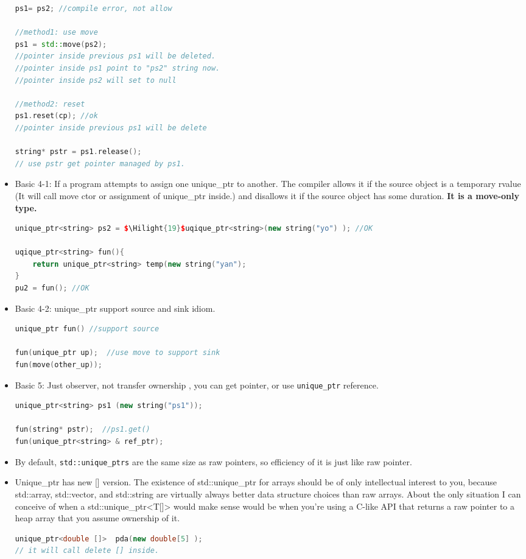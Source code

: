 \documentclass[a4paper,12pt,twoside]{book}
\newcommand{\Hilight}[1]{\makebox[0pt][l]{\color{yellow}\rule[-3pt]{#1em}{11pt}}}
\begin{document}
\begin{itemize}
\begin{lstlisting}[frame=single, language=c++]
ps1= ps2; //compile error, not allow

//method1: use move
ps1 = std::move(ps2);
//pointer inside previous ps1 will be deleted.
//pointer inside ps1 point to "ps2" string now.
//pointer inside ps2 will set to null

//method2: reset
ps1.reset(cp); //ok
//pointer inside previous ps1 will be delete

string* pstr = ps1.release();
// use pstr get pointer managed by ps1.
\end{lstlisting}

\item Basic 4-1: If a program attempts to assign one unique\_ptr to another. The compiler allows it if the source object is a temporary rvalue (It will call move ctor or assignment of unique\_ptr inside.) and disallows it if the source object has some duration. \textbf{It is a move-only type.}
\begin{lstlisting}[frame=single, language=c++, mathescape=true]
unique_ptr<string> ps2 = $\Hilight{19}$uqique_ptr<string>(new string("yo") ); //OK

uqique_ptr<string> fun(){
	return unique_ptr<string> temp(new string("yan");
}
pu2 = fun(); //OK
\end{lstlisting}

\item Basic 4-2: unique\_ptr support source and sink idiom.
\begin{lstlisting}[frame=single, language=c++]
unique_ptr fun() //support source

fun(unique_ptr up);  //use move to support sink
fun(move(other_up));
\end{lstlisting}

\item Basic 5: Just observer, not transfer ownership , you can get pointer, or use \texttt{unique\_ptr} reference.
\begin{lstlisting}[frame=single, language=c++]
unique_ptr<string> ps1 (new string("ps1"));

fun(string* pstr);  //ps1.get()
fun(unique_ptr<string> & ref_ptr);
\end{lstlisting}

\item By default, \texttt{std::unique\_ptrs} are the same size as raw pointers, so efficiency of it is just like raw pointer.

\item Unique\_ptr has new [] version. The existence of std::unique\_ptr for arrays should be of only intellectual interest to you, because std::array, std::vector, and std::string are virtually always better data structure choices than raw arrays. About the only situation I can conceive of when a std::unique\_ptr<T[]> would make sense would be when you're using a C-like API that returns a raw pointer to a heap array that you assume ownership of it.
\begin{lstlisting}[frame=single, language=c++]
unique_ptr<double []>  pda(new double[5] );
// it will call delete [] inside.
\end{lstlisting}


\end{itemize}
\end{document}
